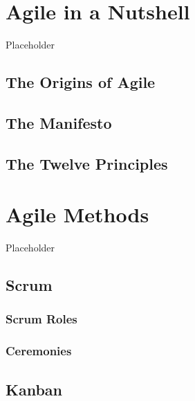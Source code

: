 \documentclass[]{book}
\begin{document}
\hypertarget{agile-in-a-nutshell}{%
\chapter{Agile in a Nutshell}\label{agile-in-a-nutshell}}

Placeholder

\hypertarget{the-origins-of-agile}{%
\section{The Origins of Agile}\label{the-origins-of-agile}}

\hypertarget{the-manifesto}{%
\section{The Manifesto}\label{the-manifesto}}

\hypertarget{the-twelve-principles}{%
\section{The Twelve Principles}\label{the-twelve-principles}}

\hypertarget{agile-methods}{%
\chapter{Agile Methods}\label{agile-methods}}

Placeholder

\hypertarget{scrum}{%
\section{Scrum}\label{scrum}}

\hypertarget{scrum-roles}{%
\subsection{Scrum Roles}\label{scrum-roles}}

\hypertarget{ceremonies}{%
\subsection{Ceremonies}\label{ceremonies}}

\hypertarget{kanban}{%
\section{Kanban}\label{kanban}}
\end{document}
